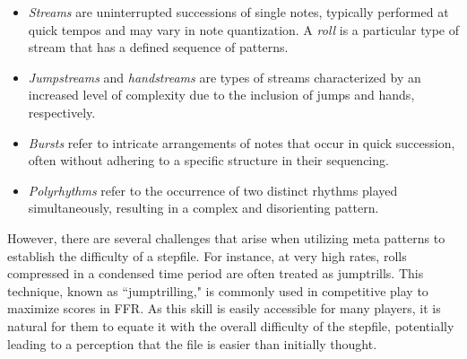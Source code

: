 \begin{itemize}
	\item \textit{Streams} are uninterrupted successions of single notes, typically performed at quick tempos and may vary in note quantization. A \textit{roll} is a particular type of stream that has a defined sequence of patterns.
	      
	\item \textit{Jumpstreams} and \textit{handstreams} are types of streams characterized by an increased level of complexity due to the inclusion of jumps and hands, respectively.
	      
	      
	      
\end{itemize}
\begin{itemize}
	\item \textit{Bursts} refer to intricate arrangements of notes that occur in quick succession, often without adhering to a specific structure in their sequencing.
	      
	\item \textit{Polyrhythms} refer to the occurrence of two distinct rhythms played simultaneously, resulting in a complex and disorienting pattern.
\end{itemize}

However, there are several challenges that arise when utilizing meta patterns to establish the difficulty of a stepfile. For instance, at very high rates, rolls compressed in a condensed time period are often treated as jumptrills. This technique, known as ``jumptrilling," is commonly used in competitive play to maximize scores in FFR. As this skill is easily accessible for many players, it is natural for them to equate it with the overall difficulty of the stepfile, potentially leading to a perception that the file is easier than initially thought.

